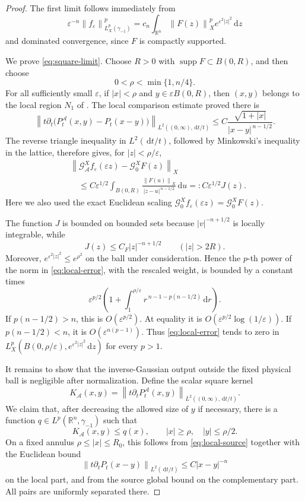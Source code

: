 \documentclass[11pt]{article}
\newcommand{\R}{\mathbb R}
\newcommand{\A}{\mathcal A}
\newcommand{\G}{\mathcal G}
\newcommand{\norm}[1]{\left\lVert #1\right\rVert}
\newcommand{\eps}{\varepsilon}
\newcommand{\dd}{\,\mathrm d}
\begin{document}
\begin{proof}
The first limit follows immediately from
\[
 \eps^{-n}\norm{f_\eps}_{L_X^p(\gamma_{-1})}^p
 =
 c_n\int_{\R^n}\norm{F(z)}_X^p e^{\eps^2|z|^2}\dd z
\]
and dominated convergence, since \(F\) is compactly supported.

We prove \eqref{eq:square-limit}. Choose \(R>0\) with
\(\operatorname{supp}F\subset B(0,R)\), and then choose
\[
 0<\rho<\min\{1,n/4\}.
\]
For all sufficiently small \(\eps\), if \(|x|<\rho\) and
\(y\in\eps B(0,R)\), then \((x,y)\) belongs to the local region \(N_1\)
of \cite{ABFR}. The local comparison estimate proved there is
\[
 \left\|t\partial_t\big(P_t^\A(x,y)-P_t(x-y)\big)
 \right\|_{L^2((0,\infty),\dd t/t)}
 \le
 C\frac{\sqrt{1+|x|}}{|x-y|^{\,n-1/2}}.
 \tag{3}\label{eq:local-source}
\]
The reverse triangle inequality in \(L^2(\dd t/t)\), followed by Minkowski's
inequality in the lattice, therefore gives, for \(|z|<\rho/\eps\),
\begin{align*}
 &\norm{\G_\A^Xf_\eps(\eps z)-\G_0^XF(z)}_X\\
 &\quad\le
 C\eps^{1/2}\int_{B(0,R)}
 \frac{\norm{F(u)}_X}{|z-u|^{\,n-1/2}}\dd u
 =:C\eps^{1/2}J(z).
 \tag{4}\label{eq:local-error}
\end{align*}
Here we also used the exact Euclidean scaling
\(\G_0^Xf_\eps(\eps z)=\G_0^XF(z)\).

The function \(J\) is bounded on bounded sets because
\(|v|^{-n+1/2}\) is locally integrable, while
\[
 J(z)\le C_F|z|^{-n+1/2}\qquad (|z|>2R).
\]
Moreover, \(e^{\eps^2|z|^2}\le e^{\rho^2}\) on the ball under
consideration. Hence the \(p\)-th power of the norm in
\eqref{eq:local-error}, with the rescaled weight, is bounded by a constant
times
\[
 \eps^{p/2}\left(
 1+\int_1^{\rho/\eps}
 r^{\,n-1-p(n-1/2)}\dd r\right).
 \tag{5}\label{eq:radial}
\]
If \(p(n-1/2)>n\), this is \(O(\eps^{p/2})\). At equality it is
\(O(\eps^{p/2}\log(1/\eps))\). If \(p(n-1/2)<n\), it is
\(O(\eps^{n(p-1)})\). Thus \eqref{eq:local-error} tends to zero in
\(L_X^p(B(0,\rho/\eps),e^{\eps^2|z|^2}\dd z)\) for every \(p>1\).

It remains to show that the inverse-Gaussian output outside the fixed
physical ball is negligible after normalization. Define the scalar square
kernel
\[
 K_\A(x,y)=
 \left\|t\partial_tP_t^\A(x,y)\right\|_{L^2((0,\infty),\dd t/t)}.
\]
We claim that, after decreasing the allowed size of \(y\) if necessary, there
is a function \(q\in L^p(\R^n,\gamma_{-1})\) such that
\[
 K_\A(x,y)\le q(x),\qquad |x|\ge\rho,\quad |y|\le\rho/2.
 \tag{6}\label{eq:majorant}
\]
On a fixed annulus \(\rho\le|x|\le R_0\), this follows from
\eqref{eq:local-source} together with the Euclidean bound
\[
 \left\|t\partial_tP_t(x-y)\right\|_{L^2(\dd t/t)}
 \le C|x-y|^{-n}
\]
on the local part, and from the source global bound on the complementary
part. All pairs are uniformly separated there.


\end{proof}
\end{document}
